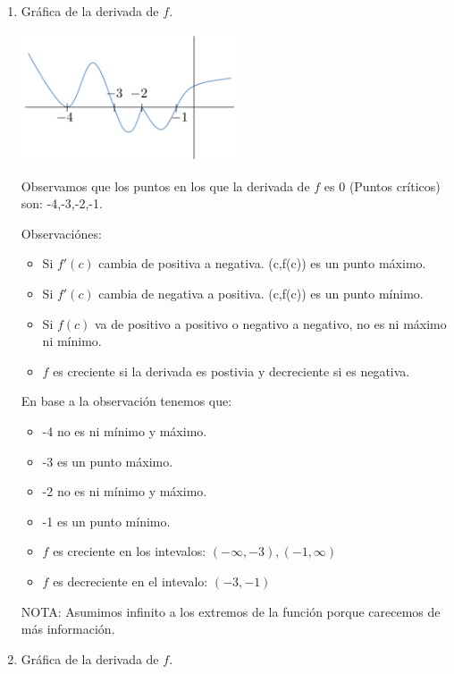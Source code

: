 \documentclass[12pt]{article}
\begin{document}
\begin{enumerate}[\hspace{9px} a)]
    \item Gr\'afica de la derivada de $f$.\medskip
    
        \includegraphics[width=0.5\textwidth]{ejer-b}\medskip

        Observamos que los puntos en los que la derivada de $f$ es 0 (Puntos cr\'iticos) son: -4,-3,-2,-1.

        Observaci\'ones: 
        \begin{itemize}
            \item Si $f'(c)$ cambia de positiva a negativa. (c,f(c)) es un punto m\'aximo.
            \item Si $f'(c)$ cambia de negativa a positiva. (c,f(c)) es un punto m\'inimo.
            \item Si $f(c)$ va de positivo a positivo o negativo a negativo, no es ni m\'aximo ni m\'inimo.
            \item $f$ es creciente si la derivada es postivia y decreciente si es negativa.
        \end{itemize}\medskip

        En base a la observaci\'on tenemos que:
        \begin{itemize}
            \item -4 no es ni m\'inimo y m\'aximo.
            \item -3 es un punto m\'aximo.
            \item -2 no es ni m\'inimo y m\'aximo.
            \item -1 es un punto m\'inimo.\bigskip
            \item $f$ es creciente en los intevalos: \((-\infty,-3),(-1,\infty)\)
            \item $f$ es decreciente en el intevalo: \((-3,-1)\)
        \end{itemize}\medskip

        NOTA: Asumimos infinito a los extremos de la funci\'on porque carecemos de m\'as informaci\'on.\medskip 

    \item Gr\'afica de la derivada de $f$.\medskip
    

\end{enumerate}
\end{document}
